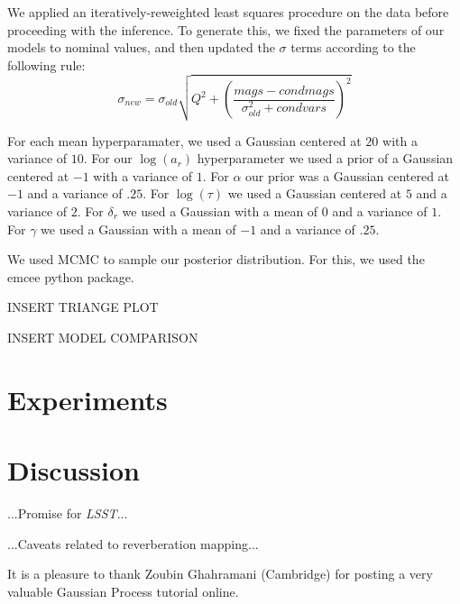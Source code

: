 \documentclass[letterpaper,12pt,preprint]{aastex}
\newcommand{\project}[1]{\textsl{#1}}
\newcommand{\lsst}{\project{LSST}}
\begin{document}
We applied an iteratively-reweighted least squares procedure on the data before proceeding with the inference. To generate this, we fixed the parameters of our models to nominal values, and then updated the $\sigma$ terms according to the following rule: \begin{equation} \sigma_{new} = \sigma_{old} \sqrt{Q^2+(\frac{mags-condmags}{\sigma_{old}^2+condvars})^2}\end{equation}

For each mean hyperparamater, we used a Gaussian centered at $20$ with a variance of $10$. For our $\log(a_r)$ hyperparameter we used a prior of a Gaussian centered at $-1$ with a variance of $1$. For $\alpha$ our prior was a Gaussian centered at $-1$ and a variance of $.25$. For $\log(\tau)$ we used a Gaussian centered at $5$ and a variance of $2$. For $\delta_r$ we used a Gaussian with a mean of $0$ and a variance of $1$. For $\gamma$ we used a Gaussian with a mean of $-1$ and a variance of $.25$. 


We used MCMC to sample our posterior distribution. For this, we used the emcee python package.

INSERT TRIANGE PLOT

INSERT MODEL COMPARISON


\section{Experiments}

\section{Discussion}

...Promise for \lsst...

...Caveats related to reverberation mapping...

It is a pleasure to thank Zoubin Ghahramani (Cambridge) for posting a
very valuable Gaussian Process tutorial online.
\end{document}
